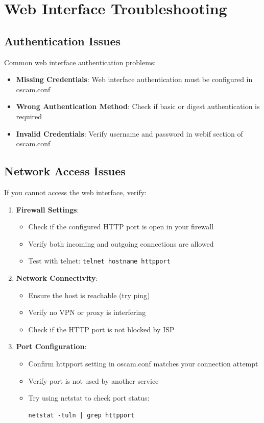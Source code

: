 \documentclass[a4paper,11pt]{report}
\begin{document}
\section{Web Interface Troubleshooting}

\subsection{Authentication Issues}
\begin{warningbox}
Common web interface authentication problems:
\begin{itemize}
    \item \textbf{Missing Credentials}: Web interface authentication must be configured in oscam.conf
    \item \textbf{Wrong Authentication Method}: Check if basic or digest authentication is required
    \item \textbf{Invalid Credentials}: Verify username and password in webif section of oscam.conf
\end{itemize}
\end{warningbox}

\subsection{Network Access Issues}
\begin{procedurebox}
If you cannot access the web interface, verify:
\begin{enumerate}
    \item \textbf{Firewall Settings}:
    \begin{itemize}
        \item Check if the configured HTTP port is open in your firewall
        \item Verify both incoming and outgoing connections are allowed
        \item Test with telnet: \verb|telnet hostname httpport|
    \end{itemize}
    \item \textbf{Network Connectivity}:
    \begin{itemize}
        \item Ensure the host is reachable (try ping)
        \item Verify no VPN or proxy is interfering
        \item Check if the HTTP port is not blocked by ISP
    \end{itemize}
    \item \textbf{Port Configuration}:
    \begin{itemize}
        \item Confirm httpport setting in oscam.conf matches your connection attempt
        \item Verify port is not used by another service
        \item Try using netstat to check port status:
        \begin{verbatim}
netstat -tuln | grep httpport
        \end{verbatim}
    \end{itemize}
\end{enumerate}
\end{procedurebox}
\end{document}
